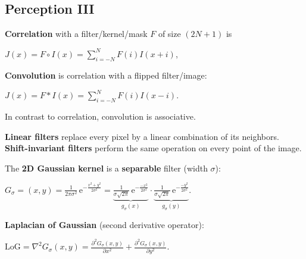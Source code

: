 \documentclass[landscape]{article}
\newcommand{\vmspace}{\vspace{-7pt}}
\newcommand{\vpspace}{\vspace{5pt}}
\newcommand{\vtspace}{\vspace{-10pt}}
\begin{document}
\begin{multicols}{3}
\vfill

\vtspace

\section{Perception III}

\vmspace

\begin{minipage}{\columnwidth}
  \textbf{Correlation} with a filter/kernel/mask $F$ of size $(2N+1)$ is
  \vmspace
  \begin{center}
    $J(x) = F \circ I(x) = \sum_{i=-N}^N F(i) I(x + i)$,
  \end{center}
\end{minipage}

\begin{minipage}{\columnwidth}
  \textbf{Convolution} is correlation with a flipped filter/image:
  \vmspace
  \begin{center}
    $J(x) = F \ast I(x) = \sum_{i=-N}^N F(i) I(x - i)$.
  \end{center}
  \vmspace
  In contrast to correlation, convolution is associative.
\end{minipage}

\vpspace

\begin{minipage}{\columnwidth}
  \textbf{Linear filters} replace every pixel by a linear combination of its
  neighbors. \textbf{Shift-invariant filters} perform the same operation on
  every point of the image.
\end{minipage}

\vpspace

\begin{minipage}{\columnwidth}
  The \textbf{2D Gaussian kernel} is a \textbf{separable} filter (width
  $\sigma$):
  \vmspace
  \begin{center}
    $
    G_\sigma = (x, y) = \frac{1}{2\pi\sigma^2}
    \,\mathrm e^{-\frac{x^2 + y^2}{2 \sigma ^2}}
    =
    \underbrace{\tfrac{1}{\sigma \sqrt{2\pi}}
    \,\mathrm e^{-\frac{-x^2}{2\sigma^2}}}_{g_\sigma(x)}
    \cdot
    \underbrace{\tfrac{1}{\sigma \sqrt{2\pi}}
    \,\mathrm e^{-\frac{-y^2}{2\sigma^2}}}_{g_\sigma(y)}.
    $
  \end{center}
\end{minipage}

\vspace{3pt}

\begin{minipage}{\columnwidth}
  \textbf{Laplacian of Gaussian} (second derivative operator):
  \vmspace
  \begin{center}
    $\mathrm{LoG} = \nabla^2 G_\sigma(x, y) = \frac{\partial^2 G_\sigma(x,
    y)}{\partial x^2} + \frac{\partial^2 G_\sigma(x, y)}{\partial y^2}.
    $
  \end{center}
\end{minipage}


\end{multicols}
\end{document}
